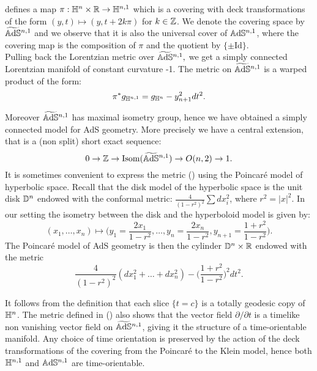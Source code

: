 defines a map $\pi:\mathbb{H}^n\times \mathbb{R}\to \mathbb{H}^{n,1}$ which is a covering with deck transformations of the form $(y,t)\mapsto (y,t+2k\pi)$ for $k\in \mathbb{Z}$. We denote the covering space by $\widetilde{\mathbb{A}\mathrm{d}\mathbb{S}}{}^{n,1}$ and we observe that it is also the universal cover of $\mathbb{A}\mathrm{d}\mathbb{S}^{n,1}$, where the covering map is the composition of $\pi$ and the quotient by $\{\pm\text{Id}\}.$\\
Pulling back the Lorentzian metric over $\widetilde{\mathbb{A}\mathrm{d}\mathbb{S}}{}^{n,1},$ we get a simply connected Lorentzian manifold of constant curvature -1. The metric on $\widetilde{\mathbb{A}\mathrm{d}\mathbb{S}}{}^{n,1}$ is a warped product of the form: 
\begin{equation}\label{metric}
     \pi^*g_{\mathbb{H}^{n,1}}=g_{\mathbb{H}^n}-y_{n+1}^{2}dt^2.
\end{equation}
   

Moreover $\widetilde{\mathbb{A}\mathrm{d}\mathbb{S}}{}^{n,1}$ has maximal isometry group, hence we have obtained a simply connected model for AdS geometry. More precisely we have a central extension, that is a (non split) short exact sequence:
\[
    0\to \mathbb{Z}\to \textnormal{Isom}(\widetilde{\mathbb{A}\mathrm{d}\mathbb{S}}{}^{n,1})\to O(n,2)\to 1.
\]
It is sometimes convenient to express the metric () using the Poincaré model of hyperbolic space. Recall that the disk model of the hyperbolic space is the unit disk $\mathbb{D}^n$ endowed with the conformal metric: $\frac{4}{(1-r^2)^2}\sum dx_i^2$, where $r^2=\vert x\vert^2$. In our setting the isometry between the disk and the hyperboloid model is given by: 
\begin{equation}
    (x_1,\dots, x_n)\mapsto \Big(y_1=\frac{2x_1}{1-r^2},\dots, y_n=\frac{2x_n}{1-r^2},y_{n+1}=\frac{1+r^2}{1-r^2}\Big). 
\end{equation}
The Poincaré model of AdS geometry is then the cylinder $\mathbb{D}^n\times \mathbb{R}$ endowed with the metric 
\begin{equation}\label{metricdisk}
    \frac{4}{(1-r^2)^2}(dx_1^2+\dots+dx_n^2)-\Big(\frac{1+r^2}{1-r^2}\Big)^{2}dt^2. 
\end{equation}

It follows from the definition that each slice $\{t=c\}$ is a totally geodesic copy of $\mathbb{H}^n$. The metric defined in () also shows that the vector field $\partial/\partial t$ is a timelike non vanishing vector field on $\widetilde{\mathbb{A}\mathrm{d}\mathbb{S}}{}^{n,1}$, giving it the structure of a time-orientable manifold. Any choice of time orientation is preserved by the action of the deck transformations of the covering from the Poincaré to the Klein model, hence both $\mathbb{H}^{n,1}$ and $\mathbb{A}\mathrm{d}\mathbb{S}^{n,1}$ are time-orientable. \\

